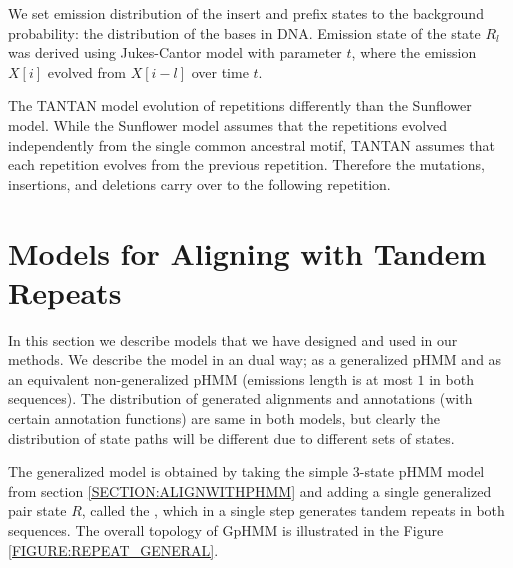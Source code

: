 We set emission distribution of the insert and prefix states to the background
probability: the distribution of the bases in DNA. Emission state of the state
$R_l$ was derived using Jukes-Cantor model with parameter $t$, where the
emission $X[i]$ evolved from $X[i-l]$ over time $t$.

The TANTAN model evolution of repetitions differently than the Sunflower model.
While the Sunflower model assumes that the repetitions evolved independently
from the single common ancestral motif,  TANTAN assumes that each repetition
evolves from the previous repetition. Therefore the mutations, insertions, and
deletions carry over to the following repetition.

\section{Models for Aligning with Tandem Repeats}\label{SECTION:REPMODELS}

In this section we describe models that we have designed and used in our
methods. We describe the model in an dual way; as a generalized pHMM and as an
equivalent non-generalized pHMM (emissions length is at most $1$ in both
sequences). The distribution of generated alignments and annotations (with
certain annotation functions) are same in both models, but clearly the
distribution of state paths will be different due to different sets of states.

The generalized model is obtained by taking the simple 3-state pHMM model from
section \ref{SECTION:ALIGNWITHPHMM} and adding a single generalized pair state
$R$, called the , which in a single step generates
tandem repeats in both sequences.  The overall topology of GpHMM is illustrated
in the Figure \ref{FIGURE:REPEAT_GENERAL}.

